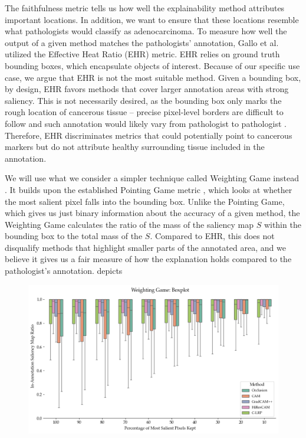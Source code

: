 The faithfulness metric tells us how well the explainability method attributes important locations.
In addition, we want to ensure that these locations resemble what pathologists would classify as adenocarcinoma.
To measure how well the output of a given method matches the pathologists' annotation, Gallo et al. \cite{gallo} utilized the Effective Heat Ratio (EHR) \cite{ehr} metric.
EHR relies on ground truth bounding boxes, which encapsulate objects of interest.
Because of our specific use case, we argue that EHR is not the most suitable method.
Given a bounding box, by design, EHR favors methods that cover larger annotation areas with strong saliency.
This is not necessarily desired, as the bounding box only marks the rough location of cancerous tissue -- precise pixel-level borders are difficult to follow \cite{gallo, annotation-agreement} and such annotation would likely vary from pathologist to pathologist \cite{annotation-agreement}.
Therefore, EHR discriminates metrics that could potentially point to cancerous markers but do not attribute healthy surrounding tissue included in the annotation.

We will use what we consider a simpler technique called Weighting Game instead \cite{weighting-game}.
It builds upon the established Pointing Game metric \cite{pointing-game}, which looks at whether the most salient pixel falls into the bounding box.
Unlike the Pointing Game, which gives us just binary information about the accuracy of a given method, the Weighting Game calculates the ratio of the mass of the saliency map $S$ within the bounding box to the total mass of the $S$.
Compared to EHR, this does not disqualify methods that highlight smaller parts of the annotated area, and we believe it gives us a fair measure of how the explanation holds compared to the pathologist's annotation.
 depicts 

\begin{figure}
    \begin{center}
    \begin{minipage}{1\textwidth}
      \includegraphics[width=\textwidth]{img/weighting-game-boxplot.png}
    \end{minipage}
    \caption{}
    \label{fig:weighting-game-boxplot}
    \end{center}
\end{figure}

